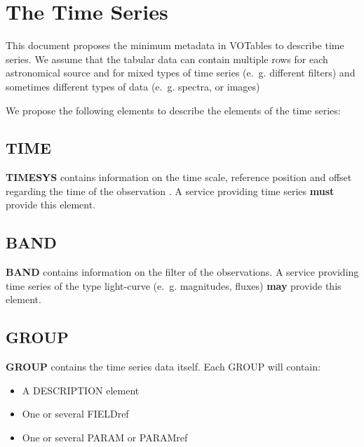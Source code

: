 \documentclass[11pt,a4paper]{ivoa}
\begin{document}

\section{The Time Series}
This document proposes the minimum metadata in VOTables to describe time series. We assume that the tabular data can contain multiple rows for each astronomical source and for mixed types of time series (e.~g. different filters) and sometimes different types of data (e.~g. spectra, or images)

We propose the following elements to describe the elements of the time series: 

\subsection{TIME}
\textbf{TIMESYS} contains information on the time scale, reference position and offset regarding the time of the observation \cite{VOTable1.4, TIMESYS}. A service providing time series \textbf{must} provide this element. 

\subsection{BAND}
\textbf{BAND} contains information on the filter of the observations. A service providing time series of the type light-curve (e.~g. magnitudes, fluxes) \textbf{may} provide this element.

\subsection{GROUP}
\textbf{GROUP} contains the time series data itself. Each GROUP will contain:
\begin{itemize}
     \item A DESCRIPTION element
     \item One or several FIELDref
     \item One or several PARAM or PARAMref
\end{itemize}



\end{document}
